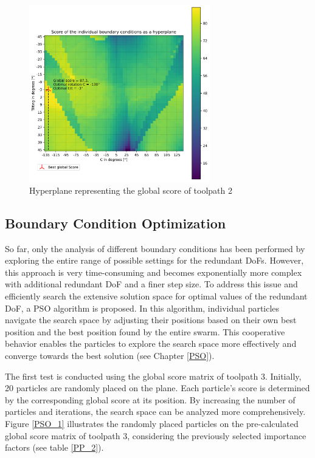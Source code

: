 \begin{figure}[H]
	\centerline{\includegraphics[width=0.7\textwidth]{figures/best_2D_2.png}}
	\caption{Hyperplane representing the global score of toolpath 2}
	\label{best_2D_2}
\end{figure}


\newpage
\subsection{Boundary Condition Optimization }
So far, only the analysis of different boundary conditions has been performed by exploring the entire range of possible settings for the redundant \acrshort{DoF}s. However, this approach is very time-consuming and becomes exponentially more complex with additional redundant \acrshort{DoF} and a finer step size. To address this issue and efficiently search the extensive solution space for optimal values of the redundant \acrshort{DoF}, a \acrshort{PSO} algorithm is proposed. In this algorithm, individual particles navigate the search space by adjusting their positions based on their own best position and the best position found by the entire swarm. This cooperative behavior enables the particles to explore the search space more effectively and converge towards the best solution (see Chapter \ref{PSO}).

The first test is conducted using the global score matrix of toolpath 3. Initially, 20 particles are randomly placed on the plane. Each particle's score is determined by the corresponding global score at its position. By increasing the number of particles and iterations, the search space can be analyzed more comprehensively. Figure \ref{PSO_1} illustrates the randomly placed particles on the pre-calculated global score matrix of toolpath 3, considering the previously selected importance factors (see table \ref{PP_2}).

